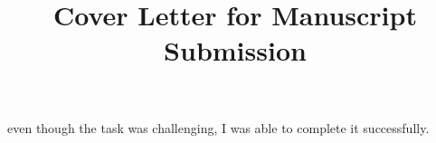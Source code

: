 \title{Cover Letter for Manuscript Submission}
even though the task was challenging, I was able to complete it successfully.